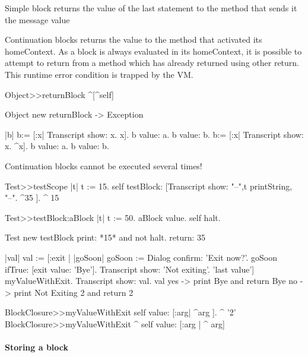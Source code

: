 \documentclass[a4paper,10pt,twoside]{book}
\begin{document}
Simple block \ct{[:x :y| x*x. x+y]} returns the value of the last statement to the method that sends it the message value

Continuation blocks \ct{[:x :y| ^ x + y]} returns the value to the method that activated its homeContext. As a block is always evaluated in its homeContext, it is possible to attempt to return from a method which has already returned using other return. This runtime error condition is trapped by the VM.

\begin{code}{}
Object>>returnBlock
	^[^self]

Object new returnBlock
-> Exception
\end{code}	
	
	
\begin{code}{}
|b| 
b:= [:x| Transcript show: x. x].
b value: a. b value: b.
b:= [:x| Transcript show: x. ^x].
b value: a. b value: b.
\end{code}
 
Continuation blocks cannot be executed several times!

\begin{code}{}
Test>>testScope
	   |t|
    	t := 15.
	   self testBlock: [Transcript show: "--",t printString, "--".
	   ^35 ].
    ^ 15

Test>>testBlock:aBlock
	   |t|
	   t := 50.
	   aBlock value.
	   self halt.
\end{code}

\begin{code}{}
Test new testBlock 	
print: *15* and not halt. 
return: 35
\end{code}


\begin{code}{}
|val|
val := [:exit |
		|goSoon|
		goSoon := Dialog confirm: 'Exit now?'.
		goSoon ifTrue: [exit value: 'Bye'].
		Transcript show: 'Not exiting'.
		'last value'] myValueWithExit.
Transcript show: val.
val
yes -> print Bye and return  Bye
no -> print Not Exiting 2 and return 2
\end{code}

\begin{code}{}
BlockClosure>>myValueWithExit
	      self value: [:arg| ^arg ].
      ^ '2'
BlockClosure>>myValueWithExit
 ^ self value: [:arg | ^ arg]        
\end{code}



\paragraph{Storing a block}
\end{document}
